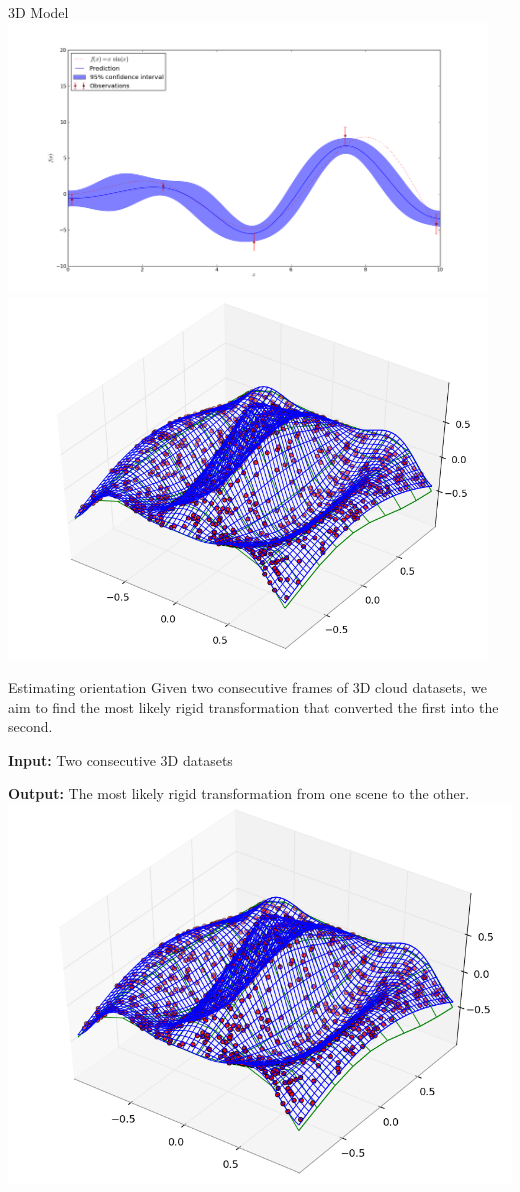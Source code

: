 \documentclass[final]{beamer}
\begin{document}
\begin{frame}{}
\begin{textblock}{27}
\begin{block}{3D Model}
\includegraphics[width=5in]{1DGaussianProcess.png}
\includegraphics[width=5in]{2DGaussianProcess.png}
\end{block}

\begin{block}{Estimating orientation}
Given two consecutive frames of 3D cloud datasets, we aim to find the most likely rigid transformation that converted the first into the second.

\textbf{Input:} Two consecutive 3D datasets

\textbf{Output:} The most likely rigid transformation from one scene to the other.
\includegraphics[width=10in]{3DWorldModel.png}
\end{block}


\end{textblock}
\end{frame}
\end{document}
